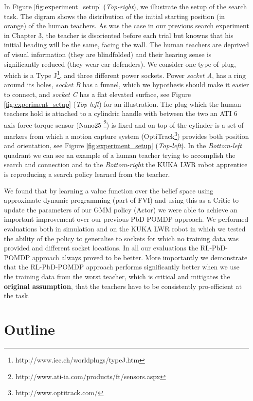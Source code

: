 In Figure \ref{fig:experiment_setup} (\textit{Top-right}), we illustrate the setup of the search task. The digram shows
the distribution of the initial starting position (in orange) of the human teachers. As was the case in our previous search experiment
in Chapter 3, the teacher is disoriented before each trial but knowns that his initial heading will be the same, facing the wall. 
The human teachers are deprived of visual information (they are blindfolded) and their hearing sense is significantly 
reduced (they wear ear defenders).  We consider one type of plug, which is a Type J\footnote{http://www.iec.ch/worldplugs/typeJ.htm}, 
and three different power sockets. Power \textit{socket A}, has a ring around its holes, \textit{socket B} has a funnel, which we 
hypothesis should make it easier to connect, and \textit{socket C} has a flat elevated surface, see Figure \ref{fig:experiment_setup}
(\textit{Top-left}) for an illustration. The plug which the human teachers hold is attached to a cylindric handle with between the two 
an ATI 6 axis force torque sensor (Nano25 \footnote{http://www.ati-ia.com/products/ft/sensors.aspx}) is fixed and on top of the 
cylinder is a set of markers from which a motion capture system (OptiTrack\footnote{http://www.optitrack.com/}) provides
both position and orientation, see Figure \ref{fig:experiment_setup} (\textit{Top-left}). In the \textit{Bottom-left} quadrant we
can see an example of a human teacher trying to accomplish the search and connection and to the \textit{Bottom-right} the KUKA
LWR robot apprentice is reproducing a search policy learned from the teacher.


We found that by learning a value function over the belief space using approximate dynamic programming (part of FVI) and using 
this as a Critic to update the parameters of our GMM policy (Actor) we were able to achieve an important improvement over our 
previous PbD-POMDP approach. We  performed evaluations both in simulation and on the KUKA LWR robot in which we tested the ability of the policy to generalise
to sockets for which no training data was provided and different socket locations. In all our evaluations the RL-PbD-POMDP 
approach always proved to be better. More importantly we demonstrate that the RL-PbD-POMDP approach performs 
significantly better when we use the training data from the worst teacher, which is critical and mitigates the 
\textbf{original assumption}, that the teachers have to be consistently pro-efficient at the task.

\section{Outline}

